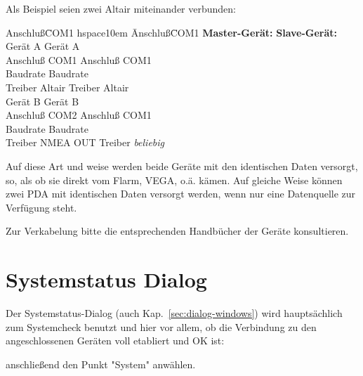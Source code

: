 Als Beispiel seien zwei \textsf{Altair} miteinander verbunden:
\begin{center}
\begin{tabbing}
Anschluß\quad\=  COM1  hspace{10em}   \=  Anschluß\quad\=  COM1\kill
\textbf{Master-Gerät:} \>                        \> \textbf{Slave-Gerät:}\\[0.5em]
\textsf{Gerät A}            \>                        \> \textsf{Gerät A}\\
Anschluß\quad\>  COM1 \>                           Anschluß\quad\>  COM1\\
Baudrate          \>                           Baudrate\\
Treiber\> \textsf{Altair}\>                           Treiber\> \textsf{Altair}\\[0.75em]
%
\textsf{Gerät B}\>                                    \>  \textsf{Gerät B}\\
Anschluß\>  COM2         \>                              Anschluß\>  COM1\\
Baudrate         \>                              Baudrate\\
Treiber\> NMEA OUT    \>                              Treiber\> \textsl{beliebig}\\[0.75em]
\end{tabbing}
\end{center}


Auf diese Art und weise werden beide Geräte mit den identischen Daten versorgt, so, als ob sie direkt vom Flarm, VEGA, o.ä. kämen. Auf gleiche Weise können zwei \textsf{PDA} mit identischen Daten versorgt werden, wenn nur eine Datenquelle zur Verfügung steht.

Zur Verkabelung bitte die entsprechenden Handbücher der Geräte konsultieren.


\section{Systemstatus Dialog}\label{sec:system-status-dialog}

Der Systemstatus-Dialog (auch Kap.~\ref{sec:dialog-windows}) wird hauptsächlich zum Systemcheck benutzt und hier vor allem, ob die Verbindung zu den angeschlossenen Geräten voll etabliert und OK ist:

\begin{quote}
\blink{}\blink{}
\end{quote}
anschließend den Punkt "System" anwählen.

